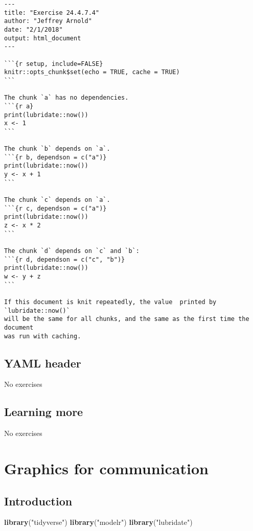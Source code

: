 \documentclass[]{book}
\newenvironment{Shaded}{\begin{snugshade}}{\end{snugshade}}
\newcommand{\KeywordTok}[1]{\textcolor[rgb]{0.13,0.29,0.53}{\textbf{#1}}}
\newcommand{\NormalTok}[1]{#1}
\newcommand{\StringTok}[1]{\textcolor[rgb]{0.31,0.60,0.02}{#1}}
\theoremstyle{plain}
\theoremstyle{remark}
\begin{document}
\begin{verbatim}
---
title: "Exercise 24.4.7.4"
author: "Jeffrey Arnold"
date: "2/1/2018"
output: html_document
---

```{r setup, include=FALSE}
knitr::opts_chunk$set(echo = TRUE, cache = TRUE)
```

The chunk `a` has no dependencies.
```{r a}
print(lubridate::now())
x <- 1
```

The chunk `b` depends on `a`.
```{r b, dependson = c("a")}
print(lubridate::now())
y <- x + 1
```

The chunk `c` depends on `a`.
```{r c, dependson = c("a")}
print(lubridate::now())
z <- x * 2
```

The chunk `d` depends on `c` and `b`:
```{r d, dependson = c("c", "b")}
print(lubridate::now())
w <- y + z
```

If this document is knit repeatedly, the value  printed by `lubridate::now()` 
will be the same for all chunks, and the same as the first time the document
was run with caching.
\end{verbatim}

\hypertarget{yaml-header}{%
\section{YAML header}\label{yaml-header}}

No exercises

\hypertarget{learning-more-1}{%
\section{Learning more}\label{learning-more-1}}

No exercises

\hypertarget{graphics-for-communication}{%
\chapter{Graphics for communication}\label{graphics-for-communication}}

\hypertarget{introduction-18}{%
\section{Introduction}\label{introduction-18}}

\begin{Shaded}
\begin{Highlighting}[]
\KeywordTok{library}\NormalTok{(}\StringTok{"tidyverse"}\NormalTok{)}
\KeywordTok{library}\NormalTok{(}\StringTok{"modelr"}\NormalTok{)}
\KeywordTok{library}\NormalTok{(}\StringTok{"lubridate"}\NormalTok{)}
\end{Highlighting}
\end{Shaded}
\end{document}

